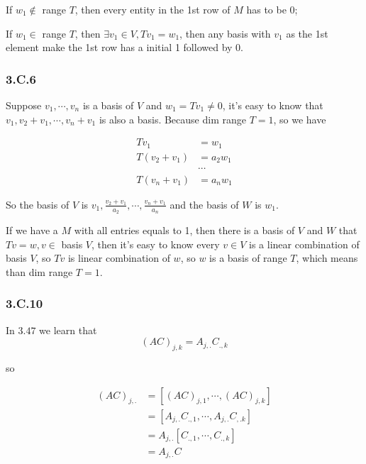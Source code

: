 If $w_{1} \notin $ range $T$, then every entity in the 1st row of $M$ has to be 0; 

If $w_{1} \in $ range $T$, then $\exists v_{1} \in V, Tv_{1} = w_{1}$, then any basis with $v_{1}$ as the 1st element make the 1st row has a initial 1 followed by 0.

\subsubsection*{3.C.6}

Suppose $v_{1}, \cdots, v_{n}$ is a basis of $V$ and $w_{1} = Tv_{1} \neq 0$, it's easy to know that $v_{1}, v_{2} + v_{1}, \cdots, v_{n}+v_{1}$ is also a basis. Because dim range $T = 1$, so we have

\begin{equation*}
    \begin{split}
    Tv_{1} & = w_{1} \\
    T(v_{2} + v_{1}) & = a_{2}w_{1} \\
    & \cdots \\
    T(v_{n} + v_{1}) & = a_{n}w_{1}
\end{split}
\end{equation*}

So the basis of $V$ is $v_{1},  \frac{v_{2} + v_{1}}{a_{2}}, \cdots, \frac{v_{n}+v_{1}}{a_{n}}$ and the basis of $W$ is $w_{1}$.


If we have a $M$ with all entries equals to 1, then there is a basis of $V$ and $W$ that $Tv = w, v\in$ basis $V$, then it's easy to know every $v\in V$ is a linear combination of basis $V$, so $Tv$ is linear combination of $w$, so $w$ is a basis of range $T$, which means than dim range $T = 1$.

\subsubsection*{3.C.10}

In $3.47$ we learn that
\[(AC)_{j,k} = A_{j,.}C_{.,k}\]

so 

\begin{equation*}
    \begin{split}
    (AC)_{j,.} &= [(AC)_{j,1}, \cdots, (AC)_{j,k}] \\
    &= [A_{j,.}C_{.,1}, \cdots, A_{j,.}C_{,.k}] \\
    &= A_{j,.}[C_{.,1}, \cdots, C_{.,k}] \\
    &= A_{j,.}C
\end{split}
\end{equation*}

